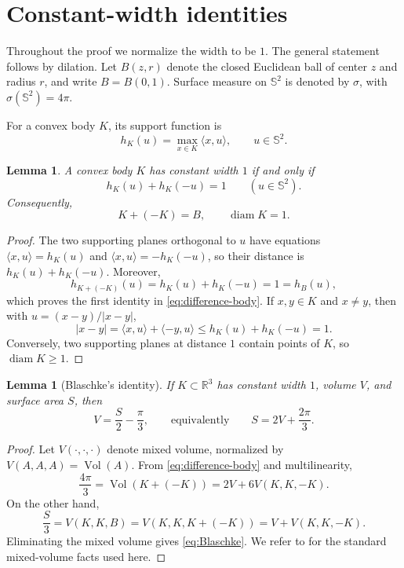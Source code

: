 \documentclass[11pt,reqno]{amsart}
\numberwithin{equation}{section}
\newtheorem{lemma}[theorem]{Lemma}
\theoremstyle{definition}
\theoremstyle{remark}
\newcommand{\R}{\mathbb{R}}
\newcommand{\Sph}{\mathbb{S}^{2}}
\newcommand{\Vol}{\operatorname{Vol}}
\newcommand{\diam}{\operatorname{diam}}
\newcommand{\ip}[2]{\langle #1,#2\rangle}
\begin{document}
\section{Constant-width identities}\label{sec:preliminaries}

Throughout the proof we normalize the width to be $1$. The general statement follows by dilation. Let $B(z,r)$ denote the closed Euclidean ball of center $z$ and radius $r$, and write $B=B(0,1)$. Surface measure on $\Sph$ is denoted by $\sigma$, with $\sigma(\Sph)=4\pi$.

For a convex body $K$, its support function is
\[
 h_K(u)=\max_{x\in K}\ip{x}{u},\qquad u\in\Sph.
\]

\begin{lemma}\label{lem:constant-width-support}
A convex body $K$ has constant width $1$ if and only if
\[
 h_K(u)+h_K(-u)=1\qquad (u\in\Sph).
\]
Consequently,
\begin{equation}\label{eq:difference-body}
 K+(-K)=B,
 \qquad
 \diam K=1.
\end{equation}
\end{lemma}

\begin{proof}
The two supporting planes orthogonal to $u$ have equations
$\ip{x}{u}=h_K(u)$ and $\ip{x}{u}=-h_K(-u)$, so their distance is $h_K(u)+h_K(-u)$. Moreover,
\[
 h_{K+(-K)}(u)=h_K(u)+h_K(-u)=1=h_B(u),
\]
which proves the first identity in \eqref{eq:difference-body}. If $x,y\in K$ and $x\neq y$, then with $u=(x-y)/|x-y|$,
\[
 |x-y|=\ip{x}{u}+\ip{-y}{u}\leq h_K(u)+h_K(-u)=1.
\]
Conversely, two supporting planes at distance $1$ contain points of $K$, so $\diam K\geq1$.
\end{proof}

\begin{lemma}[Blaschke's identity]\label{lem:Blaschke}
If $K\subset\R^{3}$ has constant width $1$, volume $V$, and surface area $S$, then
\begin{equation}\label{eq:Blaschke}
 V=\frac{S}{2}-\frac{\pi}{3},
 \qquad\text{equivalently}\qquad
 S=2V+\frac{2\pi}{3}.
\end{equation}
\end{lemma}

\begin{proof}
Let $V(\cdot,\cdot,\cdot)$ denote mixed volume, normalized by $V(A,A,A)=\Vol(A)$. From \eqref{eq:difference-body} and multilinearity,
\[
 \frac{4\pi}{3}=\Vol(K+(-K))=2V+6V(K,K,-K).
\]
On the other hand,
\[
 \frac{S}{3}=V(K,K,B)=V(K,K,K+(-K))=V+V(K,K,-K).
\]
Eliminating the mixed volume gives \eqref{eq:Blaschke}. We refer to \cite[Chapter~5]{Schneider2014} for the standard mixed-volume facts used here.
\end{proof}
\end{document}
